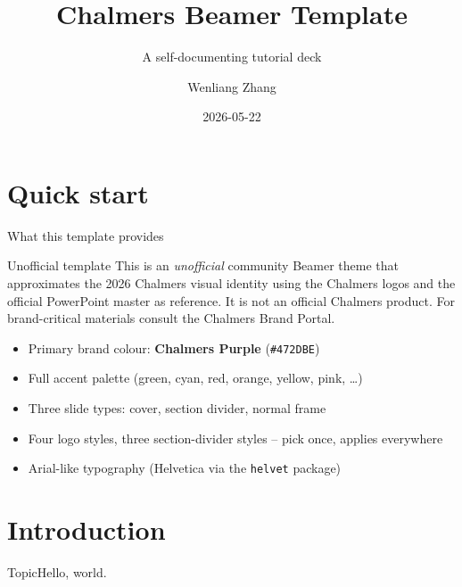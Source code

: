 \documentclass[aspectratio=169]{beamer}
\title{Chalmers Beamer Template}
\subtitle{A self-documenting tutorial deck}
\author{Wenliang Zhang}
\institute{Chalmers University of Technology}
\date{2026-05-22}
\begin{document}
\titleframe

\outlineframe

\section{Quick start}

\begin{frame}{What this template provides}
    \footnotesize
    \begin{alertblock}{Unofficial template}
        This is an \emph{unofficial} community Beamer theme that
        approximates the 2026 Chalmers visual identity using the Chalmers logos and the official PowerPoint master as reference.
        It is not an official Chalmers product.  For brand-critical
        materials consult the Chalmers Brand Portal.
    \end{alertblock}

    \medskip
    \normalsize

    \begin{itemize}
        \item Primary brand colour: \textbf{Chalmers Purple} (\texttt{\#472DBE})
        \item Full accent palette (green, cyan, red, orange, yellow, pink, \ldots)
        \item Three slide types: cover, section divider, normal frame
        \item Four logo styles, three section-divider styles -- pick once,
              applies everywhere
        \item Arial-like typography (Helvetica via the \texttt{helvet} package)
    \end{itemize}
\end{frame}

    \section{Introduction}             %
    \begin{frame}{Topic}Hello, world.\end{frame}
\end{document}
